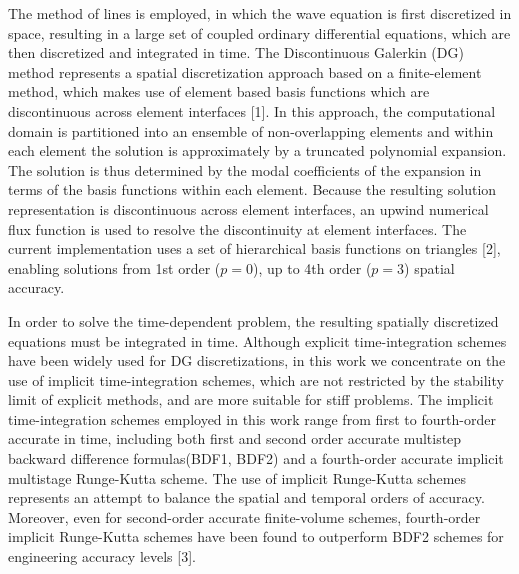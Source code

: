 \documentclass[twosided]{report}
\begin{document}
The method of lines is employed, in which the wave equation is first
discretized in space, resulting in a large set of coupled ordinary
differential equations, which are then discretized and integrated in
time. The Discontinuous Galerkin (DG) method represents a spatial
discretization approach based on a finite-element method, which makes
use of element based basis functions which are discontinuous across
element interfaces [1]. In this approach, the computational domain is
partitioned into an ensemble of non-overlapping elements and within
each element the solution is approximately by a truncated polynomial
expansion. The solution is thus determined by the modal coefficients of
the expansion in terms of the basis functions within each element.
Because the resulting solution representation is discontinuous across
element interfaces, an upwind numerical flux function is used to
resolve the discontinuity at element interfaces. The current
implementation uses a set of hierarchical basis functions on triangles
[2], enabling solutions from 1st order ($p=0$), up to 4th order
($p=3$) spatial accuracy.

In order to solve the time-dependent problem, the resulting spatially
discretized equations must be integrated in time. Although explicit
time-integration schemes have been widely used for DG discretizations,
in this work we concentrate on the use of implicit time-integration
schemes, which are not restricted by the stability limit of explicit
methods, and are more suitable for stiff problems. The implicit
time-integration schemes employed in this work range from first to
fourth-order accurate in time, including both first and second order
accurate multistep backward difference formulas(BDF1, BDF2) and a
fourth-order accurate implicit multistage Runge-Kutta scheme. The use
of implicit Runge-Kutta schemes represents an attempt to balance the
spatial and temporal orders of accuracy. Moreover, even for
second-order accurate finite-volume schemes, fourth-order implicit
Runge-Kutta schemes have been found to outperform BDF2 schemes for
engineering accuracy levels [3].
\end{document}
